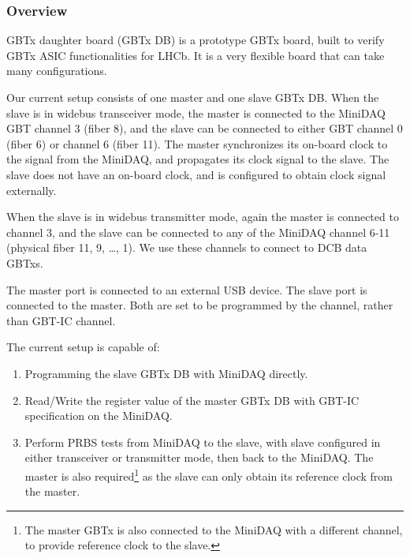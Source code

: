 \subsubsection{Overview}

GBTx daughter board (GBTx DB) is a prototype GBTx board, built to verify GBTx
ASIC functionalities for LHCb.
It is a very flexible board that can take many configurations.

Our current setup consists of one master and one slave GBTx DB.
When the slave is in widebus transceiver mode,
the master is connected to the MiniDAQ GBT channel 3 (fiber 8),
and the slave can be connected to either GBT channel 0 (fiber 6) or channel 6
(fiber 11).
The master synchronizes its on-board clock to the signal from the MiniDAQ,
and propagates its clock signal to the slave.
The slave does not have an on-board clock,
and is configured to obtain clock signal externally.

When the slave is in widebus transmitter mode,
again the master is connected to channel 3,
and the slave can be connected to any of the MiniDAQ channel 6-11
(physical fiber 11, 9, \ldots, 1).
We use these channels to connect to DCB data GBTxs.

The master \itwoc port is connected to an external USB device.
The slave \itwoc port is connected to the master.
Both are set to be programmed by the \itwoc channel,
rather than GBT-IC channel.

The current setup is capable of:
\begin{enumerate}
    \item Programming the slave GBTx DB with MiniDAQ directly.
    \item Read/Write the register value of the master GBTx DB with GBT-IC
        specification on the MiniDAQ.
    \item Perform PRBS tests from MiniDAQ to the slave, with slave configured in
        either transceiver or transmitter mode, then back to the MiniDAQ.
        The master is also required\footnote{
            The master GBTx is also connected to the MiniDAQ with a different
        channel, to provide reference clock to the slave.}
        as the slave can only obtain its reference clock from the master.
\end{enumerate}

